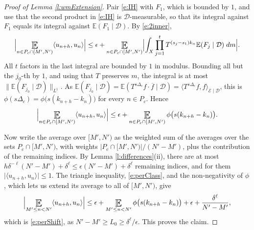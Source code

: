 \begin{proof}[Proof of Lemma \ref{l:wmExtension}]
Pair \eqref{e:IH} with $F_1$, which is bounded by $1$, and use that the second product in \eqref{e:IH} is $\mathcal D$-measurable,
so that its integral against $F_1$ equals its integral against $\mathbb E(F_1\mid \mathcal D)$.  By \eqref{e:2inner},
\begin{equation}
\Bigl\lvert \Expectation_{n \in P_c\cap[M',N')} \langle u_{n+h}, u_n\rangle \Bigr\rvert
\leq \epsilon + \Expectation_{n \in P_c\cap[M',N')} \Bigl\lvert \int_X \prod _{j=1}^t T ^{(s_j-s_1)k_n} \mathbb E(F_j \mid \mathcal D) \;dm \Bigr\rvert .
\end{equation}
All $t$ factors in the last integral are bounded by $1$ in modulus.  Bounding all but the $j_0$-th by $1$, and using that $T$ preserves $m$,
the integral is at most $\lVert \mathbb E(F_{j_0}\mid \mathcal D)\rVert _{L ^{1}}$.
As $\mathbb E(F_{j_0}\mid \mathcal D) = \mathbb E( T ^{s\Delta _c}f \cdot \overline f \mid \mathcal D) = \langle T ^{s\Delta _c}f, f\rangle _{\mathcal E\mid \mathcal D}$,
this is $\phi (s\Delta _c) = \phi \bigl(s(k_{n+h}-k_n)\bigr)$ for every $n \in P_c$.  Hence
\begin{equation} \label{e:perClass}
\Bigl\lvert \Expectation_{n \in P_c\cap[M',N')} \langle u_{n+h}, u_n\rangle \Bigr\rvert
\leq \epsilon + \Expectation_{n \in P_c\cap[M',N')} \phi \bigl(s(k_{n+h}-k_n)\bigr) .
\end{equation}

Now write the average over $[M',N')$ as the weighted sum of the averages over the sets $P_c \cap [M',N')$, with weights $\lvert P_c\cap[M',N')\rvert/(N'-M')$,
plus the contribution of the remaining indices.  By Lemma \ref{l:differences}(ii), there are at most
$h \delta ^{-\ell}(N'-M') + \delta ^{\ell} \leq \epsilon (N'-M') + \delta ^{\ell}$ remaining indices, and for them $\lvert \langle u_{n+h},u_n\rangle\rvert \leq 1$.
The triangle inequality, \eqref{e:perClass}, and the non-negativity of $\phi$, which lets us extend its average to all of $[M',N')$, give
\begin{equation}
\Bigl\lvert \Expectation_{M'\leq n<N'} \langle u_{n+h}, u_n\rangle \Bigr\rvert
\leq \epsilon + \Expectation_{M'\leq n<N'} \phi \bigl(s(k_{n+h}-k_n)\bigr) + \epsilon + \frac{\delta ^{\ell}}{N'-M'} ,
\end{equation}
which is \eqref{e:perShift}, as $N'-M' \geq L_0 \geq \delta ^{\ell}/\epsilon$.  This proves the claim.


\end{proof}
